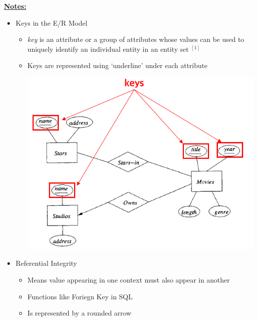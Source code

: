 \documentclass[12pt]{article}
\begin{document}
\begin{enumerate}[1.]
\begin{enumerate}[a)]
\begin{enumerate}[i)]
        \end{enumerate}
        \bigskip

        \underline{\textbf{Notes:}}

        \bigskip

        \begin{itemize}
            \item Keys in the E/R Model

            \begin{itemize}
                \item \textit{key} is an attribute or a group of attributes
                whose values can be used to uniquely identify an individual entity in an
                entity set $^{[1]}$

                \item Keys are represented using `underline' under each attribute

                \begin{center}
                \includegraphics[width=0.7\linewidth]{images/worksheet_14_solution_44.png}
                \end{center}
            \end{itemize}

            \item Referential Integrity

            \begin{itemize}
                \item Means value appearing in one context must also appear in
                another
                \item Functions like Foriegn Key in SQL
                \item Is represented by a rounded arrow


\end{itemize}
\end{itemize}
\end{enumerate}
\end{enumerate}
\end{document}
